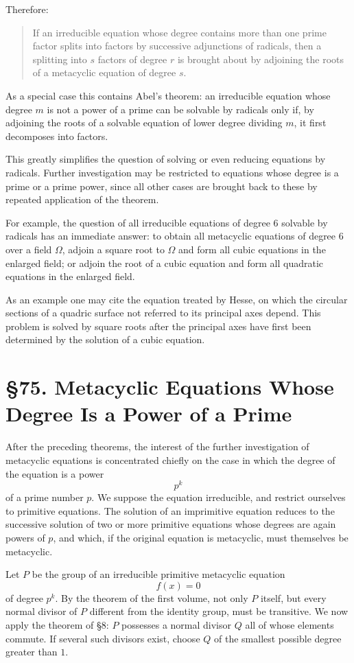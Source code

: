 \documentclass[11pt,a4paper]{book}
\newcommand{\webersection}[2]{\clearpage\section*{\S #1. #2}}
\begin{document}
Therefore:

\begin{quote}
If an irreducible equation whose degree contains more than one prime factor splits into factors by successive adjunctions of radicals, then a splitting into \(s\) factors of degree \(r\) is brought about by adjoining the roots of a metacyclic equation of degree \(s\).
\end{quote}

As a special case this contains Abel's theorem: an irreducible equation whose degree \(m\) is not a power of a prime can be solvable by radicals only if, by adjoining the roots of a solvable equation of lower degree dividing \(m\), it first decomposes into factors.

This greatly simplifies the question of solving or even reducing equations by radicals.  Further investigation may be restricted to equations whose degree is a prime or a prime power, since all other cases are brought back to these by repeated application of the theorem.

For example, the question of all irreducible equations of degree \(6\) solvable by radicals has an immediate answer: to obtain all metacyclic equations of degree \(6\) over a field \(\Omega\), adjoin a square root to \(\Omega\) and form all cubic equations in the enlarged field; or adjoin the root of a cubic equation and form all quadratic equations in the enlarged field.

As an example one may cite the equation treated by Hesse, on which the circular sections of a quadric surface not referred to its principal axes depend.  This problem is solved by square roots after the principal axes have first been determined by the solution of a cubic equation.

\webersection{75}{Metacyclic Equations Whose Degree Is a Power of a Prime}

After the preceding theorems, the interest of the further investigation of metacyclic equations is concentrated chiefly on the case in which the degree of the equation is a power
\[
 p^k
\]
of a prime number \(p\).  We suppose the equation irreducible, and restrict ourselves to primitive equations.  The solution of an imprimitive equation reduces to the successive solution of two or more primitive equations whose degrees are again powers of \(p\), and which, if the original equation is metacyclic, must themselves be metacyclic.

Let \(P\) be the group of an irreducible primitive metacyclic equation
\[
 f(x)=0
\]
of degree \(p^k\).  By the theorem of the first volume, not only \(P\) itself, but every normal divisor of \(P\) different from the identity group, must be transitive.  We now apply the theorem of \S 8: \(P\) possesses a normal divisor \(Q\) all of whose elements commute.  If several such divisors exist, choose \(Q\) of the smallest possible degree greater than \(1\).
\end{document}
